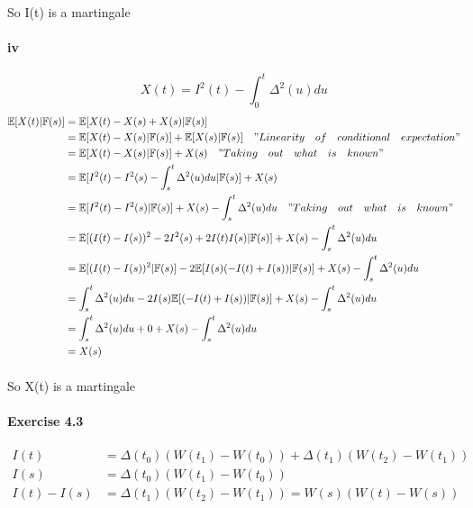 \documentclass{article}
\begin{document}
\paragraph{}{So I(t) is a martingale}
\paragraph{iv}
\begin{displaymath}
  X(t)=I^2(t)-\int_{0}^{t}\Delta^2(u)du
\end{displaymath}
\begin{align*}
  \mathbb{E}[X(t)|\mathbb{F}(s)] & =\mathbb{E}[X(t)-X(s)+X(s)|\mathbb{F}(s)] \\
   & = \mathbb{E}[X(t)-X(s)|\mathbb{F}(s)]+\mathbb{E}[X(s)|\mathbb{F}(s)] \quad "Linearity\quad of\quad conditional \quad expectation"\\
   & =\mathbb{E}[X(t)-X(s)|\mathbb{F}(s)]+X(s)\quad "Taking\quad out\quad what\quad is\quad known" \\
   & =\mathbb{E}[I^2(t)-I^2(s)-\int_{s}^{t}\Delta^2(u)du|\mathbb{F}(s)]+X(s) \\
   &  =\mathbb{E}[I^2(t)-I^2(s)|\mathbb{F}(s)]+X(s)-\int_{s}^{t}\Delta^2(u)du  \quad "Taking\quad out\quad what\quad is\quad known" \\
   & =\mathbb{E}[(I(t)-I(s))^2-2I^2(s)+2I(t)I(s)|\mathbb{F}(s)]+X(s)-\int_{s}^{t}\Delta^2(u)du \\
   &=\mathbb{E}[(I(t)-I(s))^2|\mathbb{F}(s)]-2\mathbb{E}[I(s)(-I(t)+I(s))|\mathbb{F}(s)]+X(s)-\int_{s}^{t}\Delta^2(u)du\\
   &=\int_{s}^{t}\Delta^2(u)du-2I(s)\mathbb{E}[(-I(t)+I(s))|\mathbb{F}(s)]+X(s)-\int_{s}^{t}\Delta^2(u)du\\
   &=\int_{s}^{t}\Delta^2(u)du+0+X(s)-\int_{s}^{t}\Delta^2(u)du\\
   &=X(s)
\end{align*}
\paragraph{}{So X(t) is a martingale}
\paragraph{Exercise 4.3}
\begin{align*}
  I(t) & =\Delta(t_0)(W(t_1)-W(t_0))+\Delta(t_1)(W(t_2)-W(t_1)) \\
  I(s) & =\Delta(t_0)(W(t_1)-W(t_0)) \\
  I(t)-I(s)&= \Delta(t_1)(W(t_2)-W(t_1))=W(s)(W(t)-W(s)) \\
\end{align*}
\end{document}
